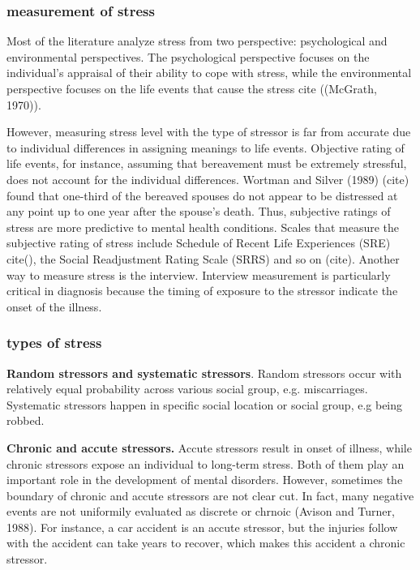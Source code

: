 \subsubsection{measurement of stress}
Most of the literature analyze stress from two perspective: psychological and environmental perspectives. The psychological perspective focuses on the individual's appraisal of their ability to cope with stress, while the environmental perspective focuses on the life events that cause the stress cite ((McGrath, 1970)). 

However, measuring stress level with the type of stressor is far from accurate due to individual differences in assigning meanings to life events. Objective rating of life events, for instance, assuming that bereavement must be extremely stressful, does not account for the individual differences.  Wortman
and Silver (1989) (cite) found that one-third of the bereaved spouses do not appear to be distressed at any point up to one year after the spouse's death. Thus, subjective ratings of stress are more predictive to mental health conditions.  Scales that measure the subjective rating of stress include Schedule of Recent Life Experiences (SRE) cite(), the Social Readjustment Rating Scale (SRRS) and so on (cite). Another way to measure stress is the interview. Interview measurement is particularly critical in diagnosis because the timing of exposure to the stressor indicate the onset of the illness.

\subsubsection{types of stress}
\textbf{Random stressors and systematic stressors}. Random stressors occur with relatively equal probability across various social group, e.g. miscarriages. Systematic stressors happen in specific social location or social group, e.g being robbed. 

\textbf{Chronic and accute stressors.}  Accute stressors result in onset of illness, while chronic stressors expose an individual to long-term stress. Both of them play an important role in the development of mental disorders. However, sometimes the boundary of chronic and accute stressors are not clear cut. In fact, many negative events are not uniformily evaluated as discrete or chrnoic (Avison and Turner, 1988). For instance, a car accident is an accute stressor, but the injuries follow with the accident can take years to recover, which makes this accident a chronic stressor.

